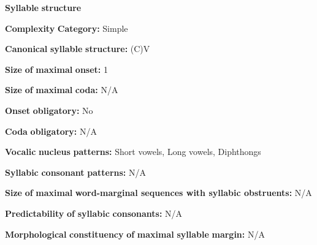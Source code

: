 \begin{styleBody}
\textbf{Syllable} \textbf{structure}
\end{styleBody}

\begin{styleBody}
\textbf{Complexity} \textbf{Category:} Simple
\end{styleBody}

\begin{styleBody}
\textbf{Canonical} \textbf{syllable} \textbf{structure:} (C)V \citep[93-95]{Wojtylak2017}
\end{styleBody}

\begin{styleBody}
\textbf{Size} \textbf{of} \textbf{maximal} \textbf{onset:} 1
\end{styleBody}

\begin{styleBody}
\textbf{Size} \textbf{of} \textbf{maximal} \textbf{coda:} N/A
\end{styleBody}

\begin{styleBody}
\textbf{Onset} \textbf{obligatory:} No
\end{styleBody}

\begin{styleBody}
\textbf{Coda} \textbf{obligatory:} N/A
\end{styleBody}

\begin{styleBody}
\textbf{Vocalic} \textbf{nucleus} \textbf{patterns:} Short vowels, Long vowels, Diphthongs
\end{styleBody}

\begin{styleBody}
\textbf{Syllabic} \textbf{consonant} \textbf{patterns:} N/A
\end{styleBody}

\begin{styleBody}
\textbf{Size} \textbf{of} \textbf{maximal} \textbf{word{}-marginal sequences with syllabic obstruents:} N/A
\end{styleBody}

\begin{styleBody}
\textbf{Predictability} \textbf{of} \textbf{syllabic} \textbf{consonants:} N/A
\end{styleBody}

\begin{styleBody}
\textbf{Morphological} \textbf{constituency} \textbf{of} \textbf{maximal} \textbf{syllable} \textbf{margin:} N/A
\end{styleBody}

